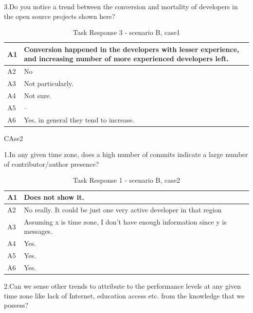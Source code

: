 \documentclass[double,12pt]{beavtex}
\begin{document}
\begin{appendices}
3.Do you notice a trend between the conversion and mortality of developers in the open source projects shown here?

\begin{table}[H]
\begin{tabular}{ |p{2cm}|p{12cm}| }
 \hline
 A1 & Conversion happened in the developers with lesser experience, and increasing number of more experienced developers left.\\
 \hline
 A2 & No\\ \hline
 A3 & Not particularly.\\ \hline
 A4 & Not sure.\\ \hline
 A5 & --\\ \hline
 A6 & Yes, in general they tend to increase.\\
 \hline
\end{tabular}
\caption{Task Response 3 - scenario B, case1}
\label{tab:table23}
\end{table}

CAse2

1.In any given time zone, does a high number of commits indicate a large number of contributor/author presence?	

\begin{table}[H]
\begin{tabular}{ |p{2cm}|p{12cm}| }
 \hline
 A1 & Does not show it.\\
 \hline
 A2 & No really. It could be just one very active developer in that region\\ \hline
 A3 & Assuming x is time zone, I don't have enough information since y is messages.\\ \hline
 A4 & Yes.\\ \hline
 A5 & Yes.\\ \hline
 A6 & Yes.\\
 \hline
\end{tabular}
\caption{Task Response 1 - scenario B, case2}
\label{tab:table31}
\end{table}

2.Can we sense other trends to attribute to the performance levels at any given time zone like lack of Internet, education access etc. from the knowledge that we possess?	


\end{appendices}
\end{document}
